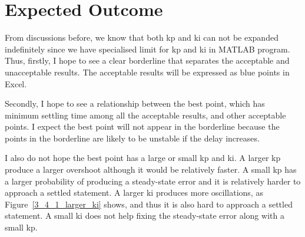 \section{Expected Outcome} %
\label{section4.2}

From discussions before, we know that both kp and ki can not be expanded indefinitely since we have specialised limit for kp and ki in MATLAB program. Thus, firstly, I hope to see a clear borderline that separates the acceptable and unacceptable results. The acceptable results will be expressed as blue points in Excel.  

Secondly, I hope to see a relationship between the best point, which has minimum settling time among all the acceptable results, and other acceptable points. I expect the best point will not appear in the borderline because the points in the borderline are likely to be unstable if the delay increases.  

I also do not hope the best point has a large or small kp and ki. A larger kp produce a larger overshoot although it would be relatively faster. A small kp has a larger probability of producing a steady-state error and it is relatively harder to approach a settled statement. A larger ki produces more oscillations, as Figure~\ref{3_4_1_larger_ki} shows, and thus it is also hard to approach a settled statement. A small ki does not help fixing the steady-state error along with a small kp.